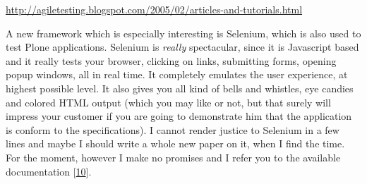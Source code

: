 \documentclass[10pt,a4paper,english]{article}
\begin{document}
\href{http://agiletesting.blogspot.com/2005/02/articles-and-tutorials.html}{http://agiletesting.blogspot.com/2005/02/articles-and-tutorials.html}

A new framework which is especially interesting is Selenium, which
is also used to test Plone applications. Selenium is \emph{really} spectacular,
since it is Javascript based and it really tests your browser, clicking
on links, submitting forms, opening popup windows, all in real time. It 
completely emulates the user experience, at highest possible level. 
It also gives
you all kind of bells and whistles, eye candies and colored HTML output
(which you may like or not, but that surely will impress your customer
if you are going to demonstrate him that the application is conform to
the specifications).
I cannot render justice to Selenium in a few lines and maybe I should write 
a whole new paper on it, when I find the time. For the moment, however I make
no promises and I refer you to the available documentation [\hyperlink{id20}{10}].



\hypertarget{references}{}
\end{document}
